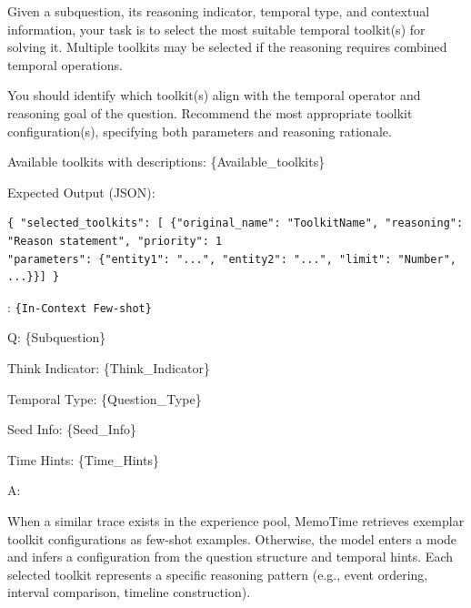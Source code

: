 \begin{center}
\begin{minipage}{0.9\columnwidth}
    \vspace{2mm}
    \centering
    \begin{tcolorbox}[title=Experience-Guided Toolkit Selection Prompt Template]
        \small
Given a subquestion, its reasoning indicator, temporal type, and contextual information, your task is to select the most suitable temporal toolkit(s) for solving it.  
Multiple toolkits may be selected if the reasoning requires combined temporal operations.

You should identify which toolkit(s) align with the temporal operator and reasoning goal of the question.  
Recommend the most appropriate toolkit configuration(s), specifying both parameters and reasoning rationale.  



Available toolkits with descriptions: \{Available\_toolkits\}

Expected Output (JSON):
\begin{verbatim}
{ "selected_toolkits": [ {"original_name": "ToolkitName", "reasoning": "Reason statement", "priority": 1
"parameters": {"entity1": "...", "entity2": "...", "limit": "Number", ...}}] }
\end{verbatim}

\vspace{5pt}
:
\texttt{\{In-Context Few-shot\}}
\vspace{5pt}

Q: \{Subquestion\}

Think Indicator: \{Think\_Indicator\}

Temporal Type: \{Question\_Type\}

Seed Info: \{Seed\_Info\}

Time Hints: \{Time\_Hints\}

A:
    \end{tcolorbox}
\end{minipage}
\end{center}
\vspace{3mm}

\noindent
When a similar trace exists in the experience pool, MemoTime retrieves exemplar toolkit configurations as few-shot examples.  
Otherwise, the model enters a  mode and infers a configuration from the question structure and temporal hints.  
Each selected toolkit represents a specific reasoning pattern (e.g., event ordering, interval comparison, timeline construction).

